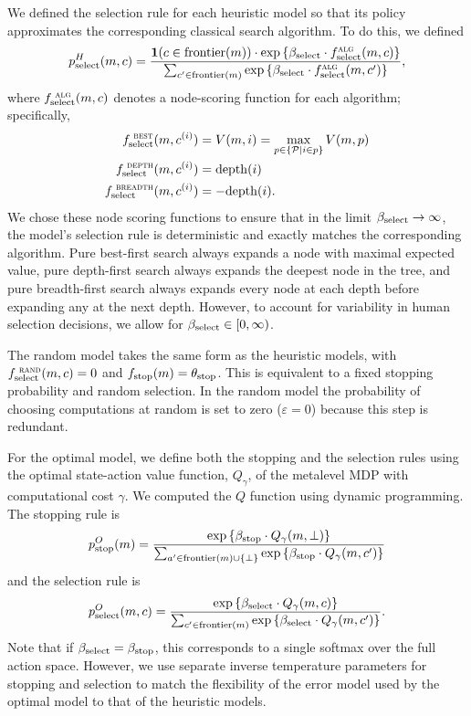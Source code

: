 We defined the selection rule for each heuristic model so that its policy approximates the corresponding classical search algorithm. To do this, we defined
\begin{equation}\label{eq:selectH}
p_{\mathrm{select}}^H(m, c) = \frac{
  \textbf{1}(c \in \mathrm{frontier}(m)) \cdot \exp\left\{\beta_{\mathrm{select}} \cdot f_{\mathrm{select}}^{\textsc{alg}}(m, c)\right\}
  }{
  \sum_{c' \in \mathrm{frontier}(m)} \exp\left\{\beta_{\mathrm{select}} \cdot f_{\mathrm{select}}^{\textsc{alg}}(m, c')\right\}
  },
\end{equation}
where $f_{\mathrm{select}}^{\textsc{ alg}}(m, c)$ denotes a node-scoring function for each algorithm; specifically, 
\begin{equation}\label{eq:scoring}
\begin{aligned}
  f_{\mathrm{select}}^{\textsc{\ best}}(m, c^{(i)}) &= V(m, i) = \max_{p \in \lbrace \mathcal{P} \mid i \in p  \rbrace} V(m, p) \\
  f_{\mathrm{select}}^{\textsc{\ depth}}(m, c^{(i)}) &= \mathrm{depth}(i)\\
  f_{\mathrm{select}}^{\textsc{\ breadth}}(m, c^{(i)}) &= -\mathrm{depth}(i).
\end{aligned}
\end{equation}
We chose these node scoring functions to ensure that in the limit $\beta_{\mathrm{select}}\rightarrow\infty$, the model's selection rule is deterministic and exactly matches the corresponding algorithm. Pure best-first search always expands a node with maximal expected value, pure depth-first search always expands the deepest node in the tree, and pure breadth-first search always expands every node at each depth before expanding any at the next depth. However, to account for variability in human selection decisions, we allow for $\beta_{\mathrm{select}}\in [0,\infty)$. 

The random model takes the same form as the heuristic models, with $f_{\mathrm{select}}^{\textsc{ rand}}(m, c) = 0$ and $f_{\mathrm{stop}}(m) = \theta_{\mathrm{stop}}$. This is equivalent to a fixed stopping probability and random selection. In the random model the probability of choosing computations at random is set to zero ($\varepsilon = 0$) because this step is redundant.

For the optimal model, we define both the stopping and the selection rules using the optimal state-action value function, $Q_\gamma$, of the metalevel MDP with computational cost $\gamma$. We computed the $Q$ function using dynamic programming. The stopping rule is
\begin{equation}\label{eq:stopO}
p_{\mathrm{stop}}^O(m) = \frac{ \exp\left\{\beta_{\mathrm{stop}} \cdot Q_\gamma(m,\bot)\right\}}{\sum_{a' \in \mathrm{frontier}(m) \cup \{\bot\}} \exp\left\{\beta_{\mathrm{stop}}  \cdot  Q_\gamma(m, c')\right\}}
\end{equation}
and the selection rule is
\begin{equation}\label{eq:selectO}
p_{\mathrm{select}}^O(m, c) = \frac{\exp\left\{\beta_{\mathrm{select}}  \cdot  Q_\gamma(m, c)\right\}}{\sum_{c' \in \mathrm{frontier}(m)}\exp\left\{\beta_{\mathrm{select}}  \cdot  Q_\gamma(m, c')\right\}}.
\end{equation}
Note that if $\beta_{\mathrm{select}} = \beta_{\mathrm{stop}}$, this corresponds to a single softmax over the full action space. However, we use separate inverse temperature parameters for stopping and selection to match the flexibility of the error model used by the optimal model to that of the heuristic models.

